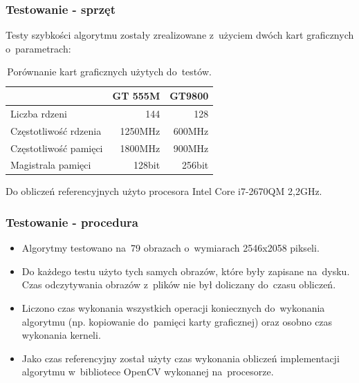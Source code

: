 \documentclass{beamer}
\begin{document}
\begin{frame}
  \frametitle{Testowanie - sprzęt}
  Testy szybkości algorytmu zostały zrealizowane z~użyciem dwóch kart graficznych o~parametrach:
\begin{center}
\begin{table}
  \caption{Porównanie kart graficznych użytych do~testów.}
  \label{tab:gpus}
     \begin{tabular}{ |l | r | r | }
     \hline
       & GT 555M & GT9800 \\ \hline
     Liczba rdzeni & 144 & 128 \\ \hline
     Częstotliwość rdzenia & 1250MHz & 600MHz \\ \hline
     Częstotliwość pamięci & 1800MHz & 900MHz \\ \hline
     Magistrala pamięci & 128bit & 256bit \\ \hline

   \end{tabular}

\end{table}
\end{center}
Do obliczeń referencyjnych użyto procesora Intel Core i7-2670QM 2,2GHz.
\end{frame}

\begin{frame}
  \frametitle{Testowanie - procedura}
\begin{itemize}
  \item Algorytmy testowano na~79 obrazach o~wymiarach 2546x2058 pikseli.
  \item Do każdego testu użyto tych samych obrazów, które były zapisane na~dysku. Czas odczytywania obrazów z~plików nie był doliczany do~czasu obliczeń.
  \item Liczono czas wykonania wszystkich operacji koniecznych do~wykonania algorytmu (np. kopiowanie do~pamięci karty graficznej) oraz osobno czas wykonania kerneli.
  \item Jako czas referencyjny został użyty czas wykonania obliczeń implementacji algorytmu w~bibliotece OpenCV wykonanej na~procesorze.

\end{itemize}


\end{frame}
\end{document}
